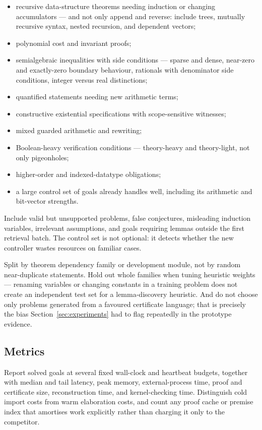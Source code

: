 \begin{itemize}[leftmargin=1.4em]
\item recursive data-structure theorems needing induction or changing
  accumulators --- and not only append and reverse: include trees, mutually
  recursive syntax, nested recursion, and dependent vectors;
\item polynomial cost and invariant proofs;
\item semialgebraic inequalities with side conditions --- sparse and dense,
  near-zero and exactly-zero boundary behaviour, rationals with denominator side
  conditions, integer versus real distinctions;
\item quantified statements needing new arithmetic terms;
\item constructive existential specifications with scope-sensitive witnesses;
\item mixed guarded arithmetic and rewriting;
\item Boolean-heavy verification conditions --- theory-heavy and theory-light,
  not only pigeonholes;
\item higher-order and indexed-datatype obligations;
\item a large control set of goals \grind{} already handles well, including its
  arithmetic and bit-vector strengths.
\end{itemize}

Include valid but unsupported problems, false conjectures, misleading induction
variables, irrelevant assumptions, and goals requiring lemmas outside the first
retrieval batch. The control set is not optional: it detects whether the new
controller wastes resources on familiar cases.

Split by theorem dependency family or development module, not by random
near-duplicate statements. Hold out whole families when tuning heuristic
weights --- renaming variables or changing constants in a training problem does
not create an independent test set for a lemma-discovery heuristic. And do not
choose only problems generated from a favoured certificate language; that is
precisely the bias Section~\ref{sec:experiments} had to flag repeatedly in the
prototype evidence.

\subsection{Metrics}

Report solved goals at several fixed wall-clock and heartbeat budgets, together
with median and tail latency, peak memory, external-process time, proof and
certificate size, reconstruction time, and kernel-checking time. Distinguish
cold import costs from warm elaboration costs, and count any proof cache or
premise index that amortises work explicitly rather than charging it only to the
competitor.

